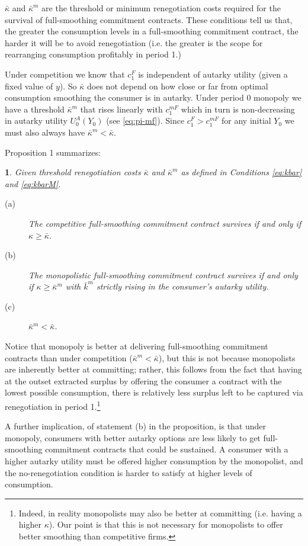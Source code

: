 \documentclass[11pt,english]{article}
\theoremstyle{plain}
\newtheorem{prop}{\protect\propositionname}
\theoremstyle{definition}
\providecommand{\propositionname}{Proposition}
\begin{document}
$\bar{\kappa}$ and $\bar{\kappa}^{m}$ are the threshold or minimum
renegotiation costs required for the survival of full-smoothing commitment
contracts. These conditions tell us that, the greater the consumption
levels in a full-smoothing commitment contract, the harder it will
be to avoid renegotiation (i.e. the greater is the scope for rearranging
consumption profitably in period 1.)

Under competition we know that $c_{1}^{F}$ is independent of autarky
utility (given a fixed value of $y$). So $\bar{\kappa}$ does not
depend on how close or far from optimal consumption smoothing the
consumer is in autarky. Under period 0 monopoly we have a threshold
$\bar{\kappa}^{m}$ that rises linearly with $c_{1}^{mF}$ which in
turn is non-decreasing in autarky utility $U_{0}^{A}(Y_{0})$ (see
\ref{eq:pi-mf}). Since $c_{1}^{F}>c_{1}^{mF}$ for any initial $Y_{0}$
we must also always have $\bar{\kappa}^{m}<\bar{\kappa}$.

Proposition 1 summarizes: 
\begin{prop}
\label{Prop:full-commit} Given threshold renegotiation costs $\bar{\kappa}$
and $\bar{\kappa}^{m}$ as defined in Conditions \ref{eq:kbar} and
\ref{eq:kbarM}. 
\begin{description}
\item [{(a)}] The competitive full-smoothing commitment contract survives
if and only if $\kappa\geq$$\bar{\kappa}$. 
\item [{(b)}] The monopolistic full-smoothing commitment contract survives
if and only if $\kappa\geq$$\bar{\kappa}^{m}$ with $\bar{k}^{m}$
strictly rising in the consumer's autarky utility. 
\item [{(c)}] $\bar{\kappa}^{m}<\bar{\kappa}$. 
\end{description}
\end{prop}
Notice that monopoly is better at delivering full-smoothing commitment
contracts than under competition ($\bar{\kappa}^{m}<\bar{\kappa}$),
but this is not because monopolists are inherently better at committing;
rather, this follows from the fact that having at the outset extracted
surplus by offering the consumer a contract with the lowest possible
consumption, there is relatively less surplus left to be captured
via renegotiation in period 1.\footnote{Indeed, in reality monopolists may also be better at committing (i.e.
having a higher $\kappa$). Our point is that this is not necessary
for monopolists to offer better smoothing than competitive firms.}

A further implication, of statement (b) in the proposition, is that
under monopoly, consumers with better autarky options are less likely
to get full-smoothing commitment contracts that could be sustained.
A consumer with a higher autarky utility must be offered higher consumption
by the monopolist, and the no-renegotiation condition is harder to
satisfy at higher levels of consumption.
\end{document}
